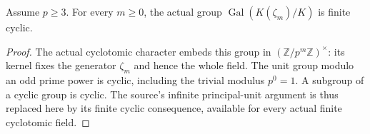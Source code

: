 \begin{lemma}
\label{ft:odd-finite-cyclotomic-cyclic}
\leanok
Assume $p\geq3$. For every $m\geq0$, the actual group
$\operatorname{Gal}(K(\zeta_m)/K)$ is finite cyclic.
\end{lemma}
\begin{proof}
The actual cyclotomic character embeds this group in
$(\mathbb Z/p^m\mathbb Z)^\times$: its kernel fixes the generator
$\zeta_m$ and hence the whole field. The unit group modulo an odd
prime power is cyclic, including the trivial modulus $p^0=1$.
A subgroup of a cyclic group is cyclic. The source's infinite
principal-unit argument is thus replaced here by its finite cyclic
consequence, available for every actual finite cyclotomic field.
\end{proof}

